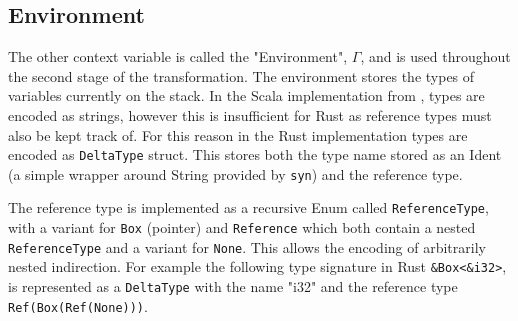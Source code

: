 \documentclass[ oneside,%
                    author={James Elgar},
                    degree={MEng},
                     title={Bidirectional transformer between functional and \\ object-oriented programming in Rust},
                  subtitle={}]{dissertation}
\newcommand{\rust}[1]{\texttt{#1}}
\begin{document}

\subsection{Environment}

The other context variable is called the "Environment", $\Gamma$, and is used throughout the second stage of the transformation. The environment stores the types of variables currently on the stack. 
In the Scala implementation from \cite{food}, types are encoded as strings, however this is insufficient for Rust as reference types must also be kept track of. For this reason in the Rust implementation types are encoded as \verb|DeltaType| struct. 
This stores both the type name stored as an Ident (a simple wrapper around String provided by \verb|syn|) and the reference type.

The reference type is implemented as a recursive Enum called \verb|ReferenceType|, with a variant for \verb|Box| (pointer) and \verb|Reference| which both contain a nested \verb|ReferenceType| and a variant for \verb|None|. This allows the encoding of arbitrarily nested indirection. For example the following type signature in Rust \rust{&Box<&i32>}, is represented as a \verb|DeltaType| with the name "i32" and the reference type \verb|Ref(Box(Ref(None)))|.



\end{document}
